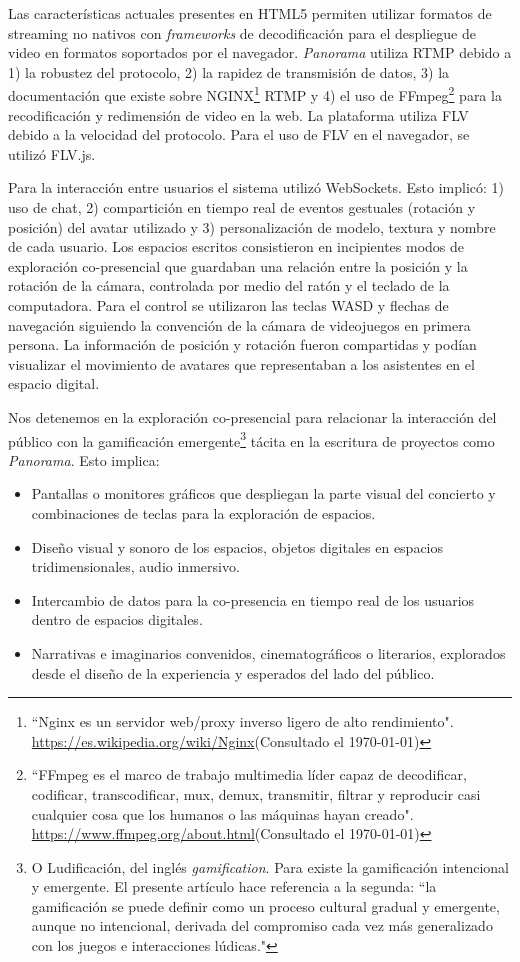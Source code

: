 Las características actuales presentes en HTML5 permiten utilizar formatos de streaming no nativos con \textit{frameworks} de decodificación para el despliegue de video en formatos soportados por el navegador. \textit{Panorama} utiliza RTMP debido a 1) la robustez del protocolo, 2) la rapidez de transmisión de datos, 3) la documentación que existe sobre NGINX\footnote{``Nginx es un servidor web/proxy inverso ligero de alto rendimiento". \url{https://es.wikipedia.org/wiki/Nginx}(Consultado el \today)} RTMP y 4) el uso de FFmpeg\footnote{``FFmpeg es el marco de trabajo multimedia líder capaz de decodificar, codificar, transcodificar, mux, demux, transmitir, filtrar y reproducir casi cualquier cosa que los humanos o las máquinas hayan creado". \url{https://www.ffmpeg.org/about.html}(Consultado el \today)} para la recodificación y redimensión de video en la web. La plataforma utiliza FLV debido a la velocidad del protocolo. Para el uso de FLV en el navegador, se utilizó FLV.js. 

Para la interacción entre usuarios el sistema utilizó WebSockets. Esto implicó: 1) uso de chat, 2) compartición en tiempo real de eventos gestuales (rotación y posición) del avatar utilizado y 3) personalización de modelo, textura y nombre de cada usuario. Los espacios escritos consistieron en incipientes modos de exploración co-presencial que guardaban una relación entre la posición y la rotación de la cámara, controlada por medio del ratón y el teclado de la computadora. Para el control se utilizaron las teclas WASD y flechas de navegación siguiendo la convención de la cámara de videojuegos en primera persona. La información de posición y rotación fueron compartidas y podían visualizar el movimiento de avatares que representaban a los asistentes en el espacio digital. 

Nos detenemos en la exploración co-presencial para relacionar la interacción del público con la gamificación emergente\footnote{O Ludificación, del inglés \textit{gamification}. Para \cite{gamificacion} existe la gamificación intencional y emergente. El presente artículo hace referencia a la segunda: ``la gamificación se puede definir como un proceso cultural gradual y emergente, aunque no intencional, derivada del compromiso cada vez más generalizado con los juegos e interacciones lúdicas."} tácita en la escritura de proyectos como \textit{Panorama}. Esto implica:

\begin{itemize}
\item Pantallas o monitores gráficos que despliegan la parte visual del concierto y combinaciones de teclas para la exploración de espacios.
\item Diseño visual y sonoro de los espacios, objetos digitales en espacios tridimensionales, audio inmersivo.
\item Intercambio de datos para la co-presencia en tiempo real de los usuarios dentro de espacios digitales.
\item Narrativas e imaginarios convenidos, cinematográficos o literarios, explorados desde el diseño de la experiencia y esperados del lado del público. 
\end{itemize}

